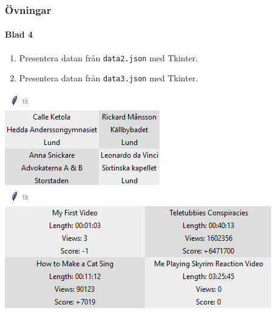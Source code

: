 \documentclass[aspectratio=169]{beamer}
\newcounter{uppgifter}
\begin{document}
\begin{frame}
	\frametitle{Övningar}
	\framesubtitle{Blad 4}
	
	\begin{enumerate}
		\setcounter{enumi}{\value{uppgifter}}
		\item Presentera datan från \texttt{data2.json} med Tkinter.
		\item Presentera datan från \texttt{data3.json} med Tkinter.
	\end{enumerate}
	
	\includegraphics[width=.3\linewidth]{svar-data2.png}
	\includegraphics[width=.5\linewidth]{svar-data3.png}

\end{frame}
\end{document}
